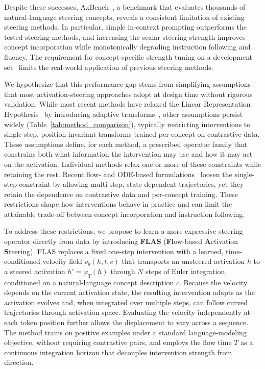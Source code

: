\documentclass{article}
\newcommand{\vt}{v_\theta}
\begin{document}
Despite these successes, AxBench~\citep{Wu2025}, a benchmark that evaluates thousands of natural-language steering concepts, reveals a consistent limitation of existing steering methods. In particular, simple in-context prompting outperforms the tested steering methods, and increasing the scalar steering strength improves concept incorporation while monotonically degrading instruction following and fluency. The requirement for concept-specific strength tuning on a development set~\citep{Wu2025} limits the real-world application of previous steering methods.
 
We hypothesize that this performance gap stems from simplifying assumptions that most activation-steering approaches adopt at design time without rigorous validation. While most recent methods have relaxed the Linear Representation Hypothesis~\citep{park2024linearrepresentationhypothesisgeometry, Panickssery2024, templeton2024scaling} by introducing adaptive transforms~\citep{Wu2024, Rodriguez2024a, You2026, Raval2026, Oozeer2026, Sun2025}, other assumptions persist widely (Table~\ref{tab:method_comparison}), typically restricting interventions to single-step, position-invariant transforms trained per concept on contrastive data. These assumptions define, for each method, a prescribed operator family that constrains both what information the intervention may use and how it may act on the activation. Individual methods relax one or more of these constraints while retaining the rest. Recent flow- and ODE-based formulations~\citep{Wang2025a, Li2026, Zhao2026} loosen the single-step constraint by allowing multi-step, state-dependent trajectories, yet they retain the dependence on contrastive data and per-concept training. These restrictions shape how interventions behave in practice and can limit the attainable trade-off between concept incorporation and instruction following.
 
To address these restrictions, we propose to learn a more expressive steering operator directly from data by introducing \textbf{FLAS} (\textbf{Fl}ow-based \textbf{A}ctivation \textbf{S}teering). FLAS replaces a fixed one-step intervention with a learned, time-conditioned velocity field $\vt(h, t, c)$ that transports an unsteered activation $h$ to a steered activation $h' = \varphi_T(h)$ through $N$ steps of Euler integration, conditioned on a natural-language concept description $c$. Because the velocity depends on the current activation state, the resulting intervention adapts as the activation evolves and, when integrated over multiple steps, can follow curved trajectories through activation space. Evaluating the velocity independently at each token position further allows the displacement to vary across a sequence. The method trains on positive examples under a standard language-modeling objective, without requiring contrastive pairs, and employs the flow time $T$ as a continuous integration horizon that decouples intervention strength from direction. 
 
\end{document}
